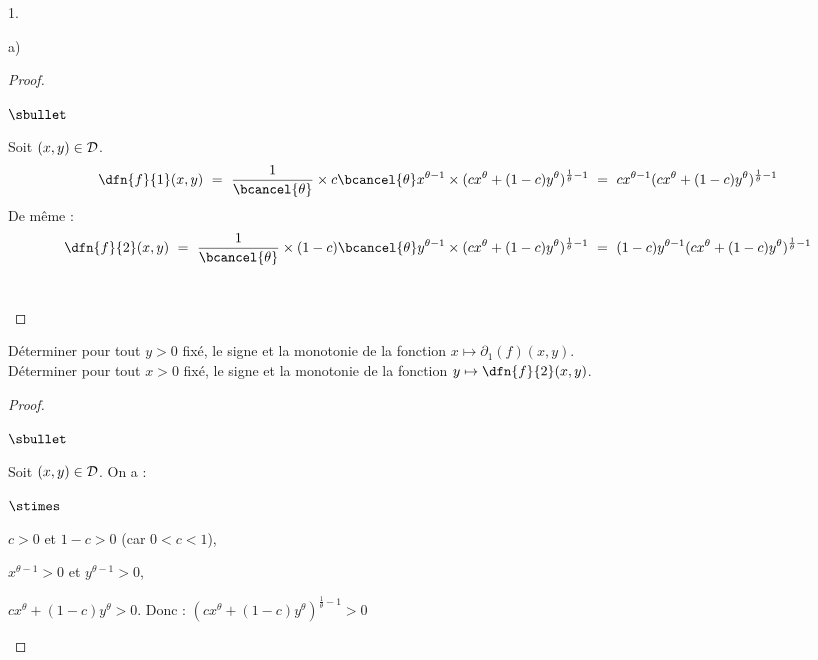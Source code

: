 \documentclass[11pt]{article}%
\begin{document}
\begin{noliste}{1.}
\begin{noliste}{a)}
\begin{proof}
\begin{noliste}{$\sbullet$}
    
    
    \item Soit $(x,y) \in {\cal D}$.
    \[
     \dfn{f}{1}(x,y) \ = \ \dfrac{1}{\bcancel{\theta}}
     \times c \bcancel{\theta} x^{\theta -1} \times 
     (c x^\theta + (1-c) y^\theta)^{\frac{1}{\theta} -1}
     \ = \ c x^{\theta-1} (c x^\theta + (1-c) 
     y^\theta)^{\frac{1}{\theta} -1}
    \]
    De même :
    \[
     \dfn{f}{2}(x,y) \ = \ \dfrac{1}{\bcancel{\theta}}
     \times (1-c) \bcancel{\theta} y^{\theta -1} \times 
     (c x^\theta + (1-c) y^\theta)^{\frac{1}{\theta} -1}
     \ = \ (1-c) y^{\theta-1} (c x^\theta + (1-c) 
     y^\theta)^{\frac{1}{\theta} -1}
    \]
    ~\\[-1.4cm]
   \end{noliste}
  \end{proof}
  
  
  
  
  
  

  
  \item Déterminer pour tout $y>0$ fixé, le signe et la monotonie de la 
  fonction $x \mapsto \partial_1(f)(x,y).$\\
  Déterminer pour tout $x>0$ fixé, le signe et la monotonie de 
  la fonction $y \mapsto \dfn{f}{2}(x,y)$.
  
  \begin{proof}~
   \begin{noliste}{$\sbullet$}
    \item Soit $(x,y) \in {\cal D}$. On a :
    \begin{noliste}{$\stimes$}
      \item $c>0$ et $1-c>0$ (car $0<c<1$),
      \item $x^{\theta-1}>0$ et $y^{\theta-1}>0$,
      \item $c x^\theta + (1-c) y^\theta >0$. Donc :
      $(c x^\theta + (1-c) y^\theta)^{\frac{1}{\theta}-1}>0$
    \end{noliste}
    

\end{noliste}
\end{proof}
\end{noliste}
\end{noliste}
\end{document}
